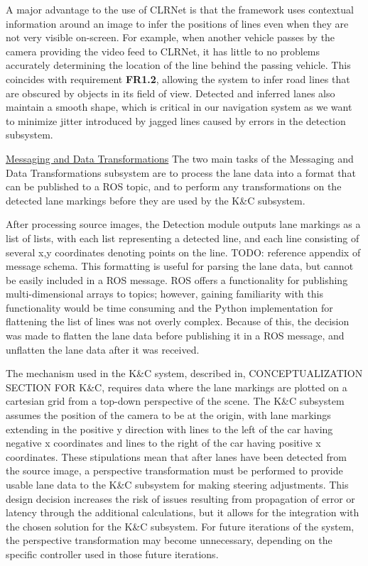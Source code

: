\documentclass[titlepage,draft]{article}
\begin{document}
{A major advantage to the use of CLRNet is that the framework uses contextual information around an image to infer the positions
of lines even when they are not very visible on-screen.
For example, when another vehicle passes by the camera providing the video feed to CLRNet, it has little to no problems
accurately determining the location of the line behind the passing vehicle.
This coincides with requirement \textbf{FR1.2}, allowing the system to infer road lines that are obscured by objects in its field
of view.
Detected and inferred lanes also maintain a smooth shape, which is critical in our navigation system as we want to minimize
jitter introduced by jagged lines caused by errors in the detection subsystem.

\underline{Messaging and Data Transformations}
The two main tasks of the Messaging and Data Transformations subsystem are to process the lane data into a format that can be published to a ROS topic, and to perform any transformations on the detected lane markings before they are used by the K\&C subsystem.

After processing source images, the Detection module outputs lane markings as a list of lists, with each list representing a detected line, and each line consisting of several x,y coordinates denoting points on the line. TODO: reference appendix of message schema. This formatting is useful for parsing the lane data, but cannot be easily included in a ROS message. ROS offers a functionality for publishing multi-dimensional arrays to topics; however, gaining familiarity with this functionality would be time consuming and the Python implementation for flattening the list of lines was not overly complex. Because of this, the decision was made to flatten the lane data before publishing it in a ROS message, and unflatten the lane data after it was received.

The mechanism used in the K\&C system, described in, CONCEPTUALIZATION SECTION FOR K\&C, requires data where the lane markings are plotted on a cartesian grid from a top-down perspective of the scene. The K\&C subsystem assumes the position of the camera to be at the origin, with lane markings extending in the positive y direction with lines to the left of the car having negative x coordinates and lines to the right of the car having positive x coordinates. These stipulations mean that after lanes have been detected from the source image, a perspective transformation must be performed to provide usable lane data to the K\&C subsystem for making steering adjustments. This design decision increases the risk of issues resulting from propagation of error or latency through the additional calculations, but it allows for the integration with the chosen solution for the K\&C subsystem. For future iterations of the system, the perspective transformation may become unnecessary, depending on the specific controller used in those future iterations.


}
\end{document}

